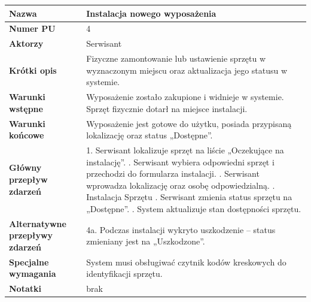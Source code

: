 \documentclass{article}
\begin{document}
    \vspace{1cm} %

    \begin{tabular}{|m{10em}|m{30em}|}
        \hline
        \textbf{Nazwa} & Instalacja nowego wyposażenia \\
        \hline
        \textbf{Numer PU} & 4 \\
        \hline
        \textbf{Aktorzy} & Serwisant \\
        \hline
        \textbf{Krótki opis} & Fizyczne zamontowanie lub ustawienie sprzętu w wyznaczonym miejscu oraz aktualizacja jego statusu w systemie. \\
        \hline
        \textbf{Warunki wstępne} & Wyposażenie zostało zakupione i widnieje w systemie. Sprzęt fizycznie dotarł na miejsce instalacji. \\
        \hline
        \textbf{Warunki końcowe} & Wyposażenie jest gotowe do użytku, posiada przypisaną lokalizację oraz status „Dostępne”. \\
        \hline
        \textbf{Główny przepływ zdarzeń} & 
            1. Serwisant lokalizuje sprzęt na liście „Oczekujące na instalację”. \newline
            2. Serwisant wybiera odpowiedni sprzęt i przechodzi do formularza instalacji. \newline
            3. Serwisant wprowadza lokalizację oraz osobę odpowiedzialną. \newline
            4. Instalacja Sprzętu \newline
            5. Serwisant zmienia status sprzętu na „Dostępne”. \newline
            6. System aktualizuje stan dostępności sprzętu. \\
        \hline
        \textbf{Alternatywne przepływy zdarzeń} & 
            4a. Podczas instalacji wykryto uszkodzenie – status zmieniany jest na „Uszkodzone”. \\
        \hline
        \textbf{Specjalne wymagania} & System musi obsługiwać czytnik kodów kreskowych do identyfikacji sprzętu. \\
        \hline
        \textbf{Notatki} & brak \\
        \hline
    \end{tabular}

    \vspace{1cm}
\end{document}
